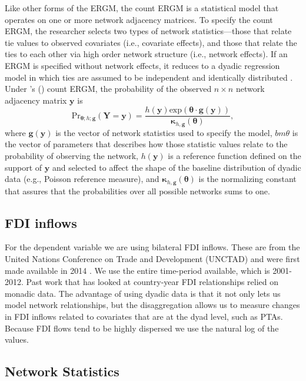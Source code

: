 \documentclass{article}
\newcommand\citeapos[1]{\citeauthor{#1}'s (\citeyear{#1})}
\begin{document}
Like other forms of the ERGM, the count ERGM is a statistical model that operates on one or more network adjacency matrices. To specify the count ERGM, the researcher selects two types of network statistics---those that relate tie values to observed covariates (i.e., covariate effects), and those that relate the ties to each other via high order network structure (i.e., network effects). If an ERGM is specified without network effects, it reduces to a dyadic regression model in which ties are assumed to be independent and identically distributed \cite{cranmer2011inferential}. Under \citeapos{krivitsky2012exponential} count ERGM, the probability of the observed $n \times n$ network adjacency matrix $\bm{y}$ is $$ \text{Pr}_{\bm{\theta};h;\bm{g}}( \bm{Y}=\bm{y} )=\frac{ h(\bm{y})\text{exp}( \bm{\theta} \cdot \bm{g} (\bm{y}) )}{\bm{\kappa}_{h,\bm{g}}(\bm{\theta})},$$ where $\bm{g}( \bm{y} )$ is the vector of network statistics used to specify the model, $bm{\theta}$ is the vector of parameters that describes how those statistic values relate to the probability of observing the network, $h(\bm{y})$ is a reference function defined on the support of $\bm{y}$ and selected to affect the shape of the baseline distribution of dyadic data (e.g., Poisson reference measure), and $\bm{\kappa}_{h,\bm{g}}(\bm{\theta})$ is the normalizing constant that assures that the probabilities over all possible networks sums to one. 






\subsection{FDI inflows}

For the dependent variable we are using bilateral FDI inflows. These are from the United Nations Conference on Trade and Development (UNCTAD) and were first made available in 2014 \citep{UNCTAD:2014}. We use the entire time-period available, which is 2001-2012. Past work that has looked at country-year FDI relationships relied on monadic data. The advantage of using dyadic data is that it not only lets us model network relationships, but the disaggregation allows us to measure changes in FDI inflows related to covariates that are at the dyad level, such as PTAs. Because FDI flows tend to be highly dispersed we use the natural log of the values. 

\subsection{Network Statistics}
\end{document}
